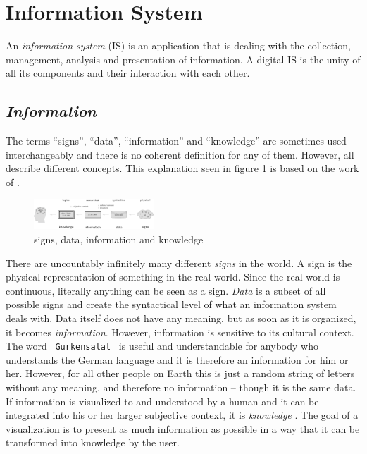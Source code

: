 

\section{Information System} %
\label{sec:information_system}

An \emph{information system} (IS) is an application that is dealing with the collection, management, analysis and presentation of information. A digital IS is the unity of all its components and their interaction with each other.

\subsection{\emph{Information}} %
\label{sub:definition_of_information}
The terms ``signs'', ``data'', ``information'' and ``knowledge'' are sometimes used interchangeably and there is no coherent definition for any of them. However, all describe different concepts. This explanation seen in figure \ref{fig:information} is based on the work of \cite{datinfwis}.

\begin{figure}[ht]
    \begin{center}
        \includegraphics[width=0.4\textwidth]{graphics/basics/information}
    \end{center}
    \caption{signs, data, information and knowledge}
    \label{fig:information}
\end{figure}

There are uncountably infinitely many different \emph{signs} in the world. A sign is the physical representation of something in the real world. Since the real world is continuous, literally anything can be seen as a sign. \emph{Data} is a subset of all possible signs and create the syntactical level of what an information system deals with. Data itself does not have any meaning, but as soon as it is organized, it becomes \emph{information}. However, information is sensitive to its cultural context. The word ~\texttt{Gurkensalat}~ is useful and understandable for anybody who understands the German language and it is therefore an information for him or her. However, for all other people on Earth this is just a random string of letters without any meaning, and therefore no information -- though it is the same data. If information is visualized to and understood by a human and it can be integrated into his or her larger subjective context, it is \emph{knowledge} \cite{nake}. The goal of a visualization is to present as much information as possible in a way that it can be transformed into knowledge by the user.


